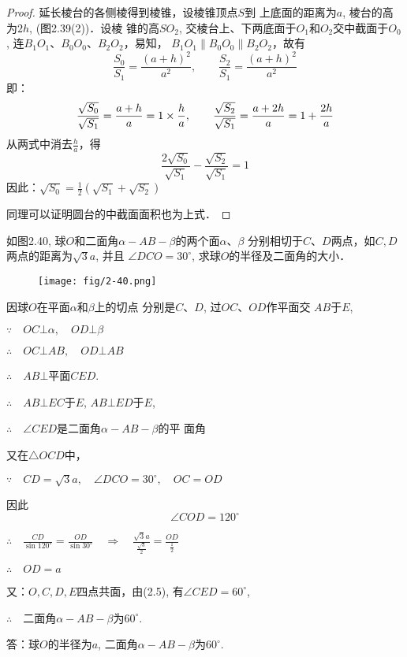 \begin{proof}
    延长棱台的各侧棱得到棱锥，设棱锥顶点$S$到
    上底面的距离为$a$, 棱台的高为$2h$, (图2.39(2))．设棱
    锥的高$SO_2$, 交棱台上、下两底面于$O_1$和$O_2$交中截面于$O_0$,
    连$B_1O_1$、$B_0O_0$、$B_2O_2$，易知，
$B_1O_1\parallel B_0O_0\parallel B_2O_2$，故有
\[\frac{S_0}{S_1}=\frac{(a+h)^2}{a^2},\qquad \frac{S_2}{S_1}=\frac{(a+h)^2}{a^2}\]
即：
\[\dfrac{\sqrt{S_0}}{\sqrt{S_1}}=\dfrac{a+h}{a}=1\times \dfrac{h}{a},\qquad \dfrac{\sqrt{S_2}}{\sqrt{S_1}}=\dfrac{a+2h}{a}=1+\dfrac{2h}{a}\]
从两式中消去$\frac{h}{a}$，得
\[\frac{2\sqrt{S_0}}{\sqrt{S_1}}-\frac{\sqrt{S_2}}{\sqrt{S_1}}=1\]
因此：$\sqrt{S_0}=\frac{1}{2}\left(\sqrt{S_1}+\sqrt{S_2}\right)$

同理可以证明圆台的中截面面积也为上式．
\end{proof}


\begin{example}
    如图2.40, 球$O$和二面角$\alpha-AB-\beta$的两个面$\alpha$、$\beta$
分别相切于$C$、$D$两点，如$C,D$两点的距离为$\sqrt{3}a$, 并且
$\angle DCO=30^{\circ}$, 求球$O$的半径及二面角的大小．
\end{example}

\begin{figure}[htp]
    \centering
 \texttt{[image: fig/2-40.png]}   
    \caption{}
\end{figure}

\begin{solution}
    因球$O$在平面$\alpha$和$\beta$上的切点
分别是$C$、$D$, 过$OC$、$OD$作平面交
$AB$于$E$,

$\because\quad OC\bot\alpha,\quad OD\bot\beta$

$\therefore\quad OC\bot AB,\quad OD\bot AB$

$\therefore\quad AB\bot$平面$CED$.

$\therefore\quad AB\bot EC$于$E$, $AB\bot ED$于$E$,

$\therefore\quad \angle CED$是二面角$\alpha-AB-\beta$的平
面角

又在$\triangle OCD$中，

$\because\quad CD=\sqrt{3}a,\quad \angle DCO=30^{\circ},\quad 
OC=OD$

因此
\begin{equation}
    \angle COD=120^{\circ}
\end{equation}

$\therefore\quad \frac{CD}{\sin120^{\circ}}=\frac{OD}{\sin30^{\circ}}\quad \Rightarrow\quad \frac{\sqrt{3}a}{\frac{\sqrt{3}}{2}}=\frac{OD}{\frac{1}{2}}$

$\therefore\quad OD=a$

又：$O,C,D,E$四点共面，由(2.5), 有$\angle CED=60^{\circ}$,

$\therefore\quad $二面角$\alpha-AB-\beta$为$60^{\circ}$.

答：球$O$的半径为$a$, 二面角$\alpha-AB-\beta$为$60^{\circ}$.
\end{solution}


